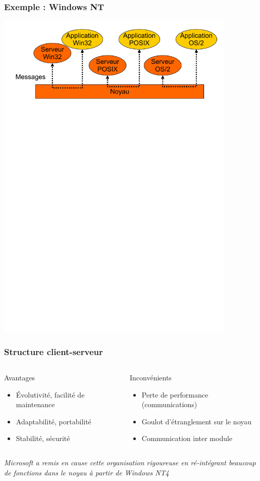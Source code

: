 \begin{frame}
\frametitle{Exemple : Windows NT}
\begin{center}
\includegraphics[width=11.5cm]{../illustration/exemple_winnt.pdf}
\end{center}
\end{frame}


\begin{frame}
\frametitle{Structure client-serveur}
\begin{columns}
\begin{block}{Avantages}
\begin{itemize}
\item Évolutivité, facilité de maintenance
\item Adaptabilité, portabilité
\item Stabilité, sécurité
\end{itemize}
\end{block}
\begin{block}{Inconvénients}
\begin{itemize}
\item Perte de performance (communications)
\item Goulot d’étranglement sur le noyau
\item Communication inter module
\end{itemize}
\end{block}
\end{columns}

\begin{center}
\textit{Microsoft a remis en cause cette organisation rigoureuse en ré-intégrant beaucoup de fonctions dans le noyau à partir de Windows NT4}
\end{center}
\end{frame}


